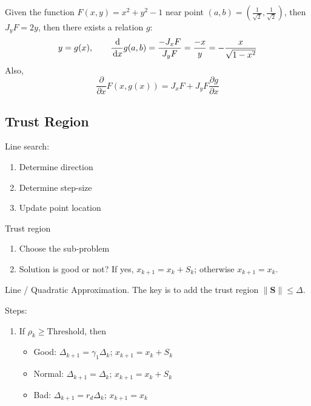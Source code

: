 \begin{example}
Given the function $F(x,y)=x^2+y^2-1$ near point $(a,b)=(\frac{1}{\sqrt{2}},\frac{1}{\sqrt{2}})$, then $J_yF=2y$, then there exists a relation $g$:
\[
y=g(x),\qquad
\frac{\,\mathrm{d}}{\,\mathrm{d} x}g(a,b)=\frac{-J_xF}{J_yF}=\frac{-x}{y}=-\frac{x}{\sqrt{1-x^2}}
\]
Also,
\[
\frac{\partial}{\partial x}F(x,g(x))=J_xF+J_yF\frac{\partial g}{\partial x}
\]




\end{example}
\subsection{Trust Region}
Line search:
\begin{enumerate}
\item
Determine direction
\item
Determine step-size
\item
Update point location
\end{enumerate}
Trust region
\begin{enumerate}
\item
Choose the sub-problem
\item
Solution is good or not? If yes, $x_{k+1}=x_k+S_k$; otherwise $x_{k+1}=x_k$.
\end{enumerate}
Line / Quadratic Approximation. The key is to add the trust region $\|\bm S\|\le\Delta$.

Steps:
\begin{enumerate}
\item
If $\rho_k\ge\mbox{Threshold}$, then
\begin{itemize}
\item
Good: $\Delta_{k+1} = \gamma_1\Delta_k$; $x_{k+1}=x_k+S_k$
\item
Normal: $\Delta_{k+1} = \Delta_k$; $x_{k+1} = x_k+S_k$
\item
Bad: $\Delta_{k+1} = r_d\Delta_k$; $x_{k+1}=x_k$
\end{itemize}
\end{enumerate}















